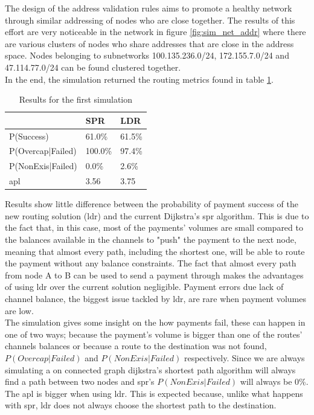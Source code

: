 The design of the address validation rules aims to promote a healthy network through similar addressing of nodes who are close together. The results of this effort are very noticeable in the network in figure \ref{fig:sim_net_addr} where there are various clusters of nodes who share addresses that are close in the address space. Nodes belonging to subnetworks 100.135.236.0/24, 172.155.7.0/24 and 47.114.77.0/24 can be found clustered together.\\
In the end, the simulation returned the routing metrics found in table \ref{table:simulation_results1}.

\begin{table}[H]
\begin{tabular}{l|l|l|}
\cline{2-3}
\rowcolor[HTML]{C0C0C0} 
\cellcolor[HTML]{FFFFFF}                  & SPR     & LDR    \\ \hline
\multicolumn{1}{|l|}{P(Success)}          & 61.0\%  & 61.5\% \\ \hline
\multicolumn{1}{|l|}{P(Overcap|Failed)}   & 100.0\% & 97.4\% \\ \hline
\multicolumn{1}{|l|}{P(NonExis|Failed)}   & 0.0\%   & 2.6\%  \\ \hline
\multicolumn{1}{|l|}{\acrshort{apl}} & 3.56    & 3.75   \\ \hline
\end{tabular}
\caption{Results for the first simulation}
\label{table:simulation_results1}
\end{table}

Results show little difference between the probability of payment success of the new routing solution (\acrshort{ldr}) and the current Dijkstra's \acrfull{spr} algorithm. This is due to the fact that, in this case, most of the payments' volumes are small compared to the balances available in the channels to "push" the payment to the next node, meaning that almost every path, including the shortest one, will be able to route the payment without any balance constraints. The fact that almost every path from node A to B can be used to send a payment through makes the advantages of using \acrshort{ldr} over the current solution negligible. Payment errors due lack of channel balance, the biggest issue tackled by \acrshort{ldr}, are rare when payment volumes are low.\\
The simulation gives some insight on the how payments fail, these can happen in one of two ways; because the payment's volume is bigger than one of the routes' channels balances or because a route to the destination was not found, $P(Overcap|Failed)$ and $P(NonExis|Failed)$ respectively. Since we are always simulating a on connected graph dijkstra's shortest path algorithm will always find a path between two nodes and \acrshort{spr}'s $P(NonExis|Failed)$ will always be 0\%.\\
The \acrfull{apl} is bigger when using \acrshort{ldr}. This is expected because, unlike what happens with \acrshort{spr}, \acrshort{ldr}  does not always choose the shortest path to the destination.

